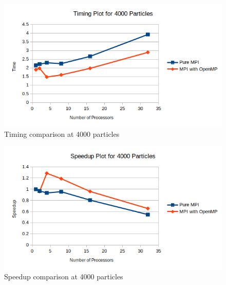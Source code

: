 \documentclass{article}
\begin{document}
\begin{figure}[H]
	\begin{center}
		\hspace*{-0.5cm}                                                           
  		\includegraphics[scale=0.7]{Report_Assets/timing4000.png}
  	\end{center}
  	\caption{Timing comparison at 4000 particles}
\end{figure}

\begin{figure}[H]
	\begin{center}
		\hspace*{-0.5cm}                                                           
  		\includegraphics[scale=0.7]{Report_Assets/speedup4000.png}
  	\end{center}
  	\caption{Speedup comparison at 4000 particles}
\end{figure}
\end{document}
